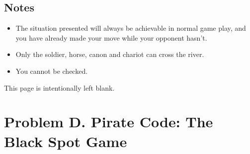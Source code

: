 \documentclass[12pt,a4paper]{article}
\newcommand*{\blankpage}{%
\vspace*{\fill}
{\centering \huge This page is intentionally left blank.\par}
\vspace{\fill}}
\begin{document}
\subsection*{\fontsize{16}{12}Notes}
\begin{itemize}
\item  The situation presented will always be achievable in normal game play, and you have already made your move while your opponent hasn't.
\item Only the soldier, horse, canon and chariot can
cross the river.
\item You cannot be checked.
\end{itemize}

\newpage
\blankpage
\newpage

\section*{\fontsize{18}{12}Problem D. Pirate Code: The Black Spot Game}
\end{document}
